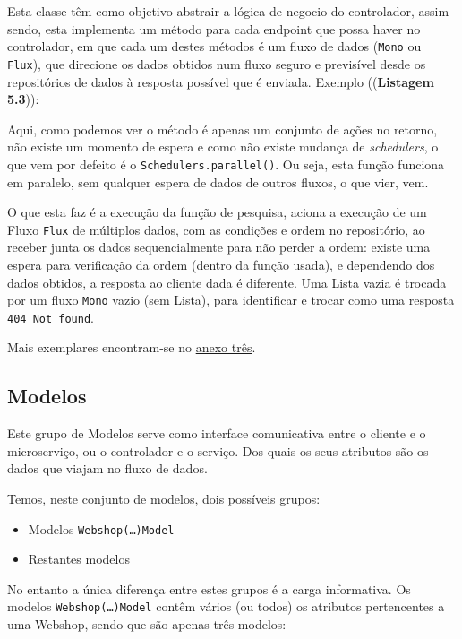 Esta classe têm como objetivo abstrair a lógica de negocio do controlador, assim sendo, esta implementa um método para cada endpoint que possa haver no controlador, em que cada um destes métodos é um fluxo de dados (\texttt{Mono} ou \texttt{Flux}), que direcione os dados obtidos num fluxo seguro e previsível desde os repositórios de dados à resposta possível que é enviada. Exemplo ((\textbf{Listagem 5.3})):



Aqui, como podemos ver o método é apenas um conjunto de ações no retorno, não existe um momento de espera e como não existe mudança de \textit{schedulers}, o que vem por defeito é o \texttt{Schedulers.parallel()}. Ou seja, esta função funciona em paralelo, sem qualquer espera de dados de outros fluxos, o que vier, vem.

O que esta faz é a execução da função de pesquisa, aciona a execução de um Fluxo \texttt{Flux} de múltiplos dados, com as condições e ordem no repositório, ao receber junta os dados sequencialmente para não perder a ordem: existe uma espera para verificação da ordem (dentro da função usada), e dependendo dos dados obtidos, a resposta ao cliente dada é diferente. Uma Lista vazia é trocada por um fluxo \texttt{Mono} vazio (sem Lista), para identificar e trocar como uma resposta \texttt{404 Not found}.

Mais exemplares encontram-se no \hyperref[an3]{anexo três}.

\newpage

\subsection{Modelos}

Este grupo de Modelos serve como interface comunicativa entre o cliente e o microserviço, ou o controlador e o serviço. Dos quais os seus atributos são os dados que viajam no fluxo de dados.

Temos, neste conjunto de modelos, dois possíveis grupos:

\begin{itemize}
  \item {Modelos \texttt{Webshop(\ldots)Model}}
  \item {Restantes modelos}
\end{itemize}

No entanto a única diferença entre estes grupos é a carga informativa. Os modelos \texttt{Webshop(\dots)Model} contêm vários (ou todos) os atributos pertencentes a uma Webshop, sendo que são apenas três modelos:

